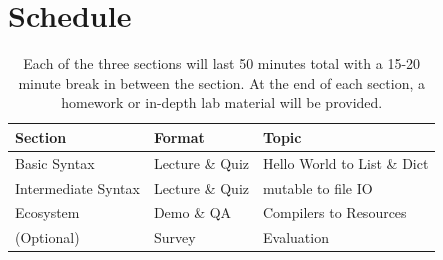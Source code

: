 \documentclass{tufte-handout}
\begin{document}
\section{Schedule}\label{sec:schedule}
\begin{table}[ht]
  \selectfont
  \begin{tabular}{lll}
    \toprule
    Section & Format & Topic \\
    \midrule
    Basic Syntax & Lecture \& Quiz & Hello World to List \& Dict \\
    Intermediate Syntax & Lecture \& Quiz & mutable to file IO \\
    Ecosystem & Demo \& QA & Compilers to Resources \\
    (Optional) & Survey & Evaluation \\
    \bottomrule
  \end{tabular}
  \caption{Each of the three sections will last 50 minutes total with a
    15-20 minute break in between the section. At the
    end of each section, a homework or in-depth lab material will be
    provided.}
  \label{tab:Schedule}
\end{table}
\end{document}
